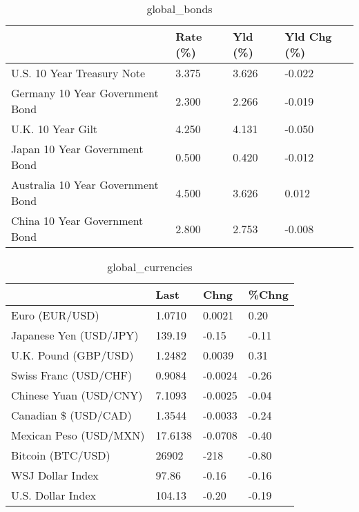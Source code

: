 \documentclass{article}%
\begin{document}
%


\begin{table}[htbp]%
\caption{global\_bonds}%
\centering%
\begin{adjustbox}{width=1\textwidth}%
\begin{tabular}{llll}
\toprule
                                  & Rate (\%) & Yld (\%) & Yld Chg (\%) \\
\midrule
       U.S. 10 Year Treasury Note &    3.375 &   3.626 &      -0.022 \\
  Germany 10 Year Government Bond &    2.300 &   2.266 &      -0.019 \\
                U.K. 10 Year Gilt &    4.250 &   4.131 &      -0.050 \\
    Japan 10 Year Government Bond &    0.500 &   0.420 &      -0.012 \\
Australia 10 Year Government Bond &    4.500 &   3.626 &       0.012 \\
    China 10 Year Government Bond &    2.800 &   2.753 &      -0.008 \\
\bottomrule
\end{tabular}
%
\end{adjustbox}%
\end{table}

%


\begin{table}[htbp]%
\caption{global\_currencies}%
\centering%
\begin{adjustbox}{width=1\textwidth}%
\begin{tabular}{llll}
\toprule
                       &    Last &    Chng & \%Chng \\
\midrule
        Euro (EUR/USD) &  1.0710 &  0.0021 &  0.20 \\
Japanese Yen (USD/JPY) &  139.19 &   -0.15 & -0.11 \\
  U.K. Pound (GBP/USD) &  1.2482 &  0.0039 &  0.31 \\
 Swiss Franc (USD/CHF) &  0.9084 & -0.0024 & -0.26 \\
Chinese Yuan (USD/CNY) &  7.1093 & -0.0025 & -0.04 \\
  Canadian \$ (USD/CAD) &  1.3544 & -0.0033 & -0.24 \\
Mexican Peso (USD/MXN) & 17.6138 & -0.0708 & -0.40 \\
     Bitcoin (BTC/USD) &   26902 &    -218 & -0.80 \\
      WSJ Dollar Index &   97.86 &   -0.16 & -0.16 \\
     U.S. Dollar Index &  104.13 &   -0.20 & -0.19 \\
\bottomrule
\end{tabular}
%
\end{adjustbox}%
\end{table}
\end{document}
